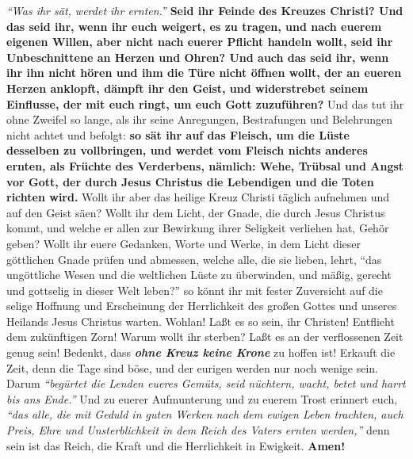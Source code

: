 \textit{"`Was ihr sät, werdet ihr ernten."'}
\label{ref:18_11_feinde_des_kreuzes}
\textbf{Seid ihr Feinde des Kreuzes Christi? Und das seid
ihr, wenn ihr euch weigert, es zu tragen, und nach euerem eigenen Willen, aber
nicht nach euerer Pflicht handeln wollt, seid ihr
Unbeschnittene an Herzen und
Ohren? Und auch das seid ihr, wenn ihr ihn nicht hören und ihm die Türe nicht
öffnen wollt, der an eueren Herzen anklopft, dämpft ihr den Geist, und
widerstrebet seinem Einflusse, der mit euch ringt, um euch Gott zuzuführen?}
Und das tut ihr ohne Zweifel so lange, als ihr seine Anregungen, Bestrafungen
und Belehrungen nicht achtet und befolgt: \textbf{so sät ihr auf das Fleisch,
um die
Lüste desselben zu vollbringen, und werdet vom Fleisch nichts anderes ernten,
als Früchte des Verderbens, nämlich: Wehe, Trübsal und Angst vor Gott, der durch
Jesus Christus die Lebendigen und die Toten richten wird.} Wollt ihr aber
das heilige Kreuz Christi täglich aufnehmen und auf den Geist säen? Wollt ihr
dem Licht, der Gnade, die durch Jesus Christus kommt, und welche er allen
zur Bewirkung ihrer Seligkeit verliehen hat, Gehör geben? Wollt ihr euere
Gedanken, Worte und Werke, in dem Licht dieser göttlichen
Gnade prüfen und abmessen, welche alle, die sie lieben, lehrt,
"`das ungöttliche Wesen und die weltlichen Lüste zu 
überwinden, und mäßig, gerecht
und gottselig in dieser Welt leben?"'
so könnt ihr mit fester Zuversicht auf
die selige Hoffnung und Erscheinung der Herrlichkeit des großen Gottes und
unseres Heilands Jesus Christus warten.
Wohlan! Laßt es so
sein, ihr Christen! Entflieht dem zukünftigen Zorn! Warum wollt ihr sterben?
Laßt es an der verflossenen Zeit genug sein! Bedenkt, dass \textbf{\textit{ohne
Kreuz keine Krone}} zu hoffen ist! Erkauft die Zeit, denn die
Tage sind böse, und der eurigen werden nur noch wenige 
sein. Darum
\textit{"`begürtet die Lenden eueres Gemüts, seid nüchtern, wacht, betet und 
harrt bis ans Ende."'} Und zu euerer Aufmunterung und zu euerem Trost erinnert 
euch, \textit{"`das alle, die mit
Geduld in guten Werken nach dem ewigen Leben trachten, auch Preis, Ehre und
Unsterblichkeit in dem Reich des Vaters ernten werden,"'}
denn sein ist das Reich, die Kraft und die Herrlichkeit in Ewigkeit.
\textbf{Amen!}



